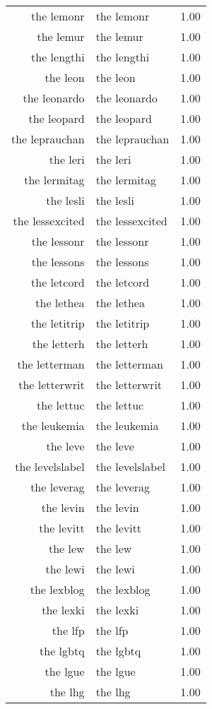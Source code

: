 \begin{table}[ht]
\begin{tabular}{rlr}
  the lemonr & the lemonr & 1.00 \\ 
  the lemur & the lemur & 1.00 \\ 
  the lengthi & the lengthi & 1.00 \\ 
  the leon & the leon & 1.00 \\ 
  the leonardo & the leonardo & 1.00 \\ 
  the leopard & the leopard & 1.00 \\ 
  the leprauchan & the leprauchan & 1.00 \\ 
  the leri & the leri & 1.00 \\ 
  the lermitag & the lermitag & 1.00 \\ 
  the lesli & the lesli & 1.00 \\ 
  the lessexcited & the lessexcited & 1.00 \\ 
  the lessonr & the lessonr & 1.00 \\ 
  the lessons & the lessons & 1.00 \\ 
  the letcord & the letcord & 1.00 \\ 
  the lethea & the lethea & 1.00 \\ 
  the letitrip & the letitrip & 1.00 \\ 
  the letterh & the letterh & 1.00 \\ 
  the letterman & the letterman & 1.00 \\ 
  the letterwrit & the letterwrit & 1.00 \\ 
  the lettuc & the lettuc & 1.00 \\ 
  the leukemia & the leukemia & 1.00 \\ 
  the leve & the leve & 1.00 \\ 
  the levelslabel & the levelslabel & 1.00 \\ 
  the leverag & the leverag & 1.00 \\ 
  the levin & the levin & 1.00 \\ 
  the levitt & the levitt & 1.00 \\ 
  the lew & the lew & 1.00 \\ 
  the lewi & the lewi & 1.00 \\ 
  the lexblog & the lexblog & 1.00 \\ 
  the lexki & the lexki & 1.00 \\ 
  the lfp & the lfp & 1.00 \\ 
  the lgbtq & the lgbtq & 1.00 \\ 
  the lgue & the lgue & 1.00 \\ 
  the lhg & the lhg & 1.00 \\ 

\end{tabular}
\end{table}
